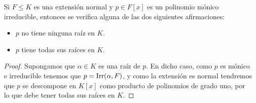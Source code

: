 \begin{observacion}
    Si $F\leq K$ es una extensión normal y $p\in F[x]$ es un polinomio mónico irreducible, entonces se verifica alguna de las dos siguientes afirmaciones:
    \begin{itemize}
        \item $p$ no tiene ninguna raíz en $K$.
        \item $p$ tiene todas sus raíces en $K$.
    \end{itemize}
    \begin{proof}
        Supongamos que $\alpha\in K$ es una raíz de $p$. En dicho caso, como $p$ es mónico e irreducible tenemos que $p = \operatorname{Irr}(\alpha,F)$, y como la extensión es normal tendremos que $p$ se descompone en $K[x]$ como producto de polinomios de grado uno, por lo que debe tener todas sus raíces en $K$.
    \end{proof}
\end{observacion}

